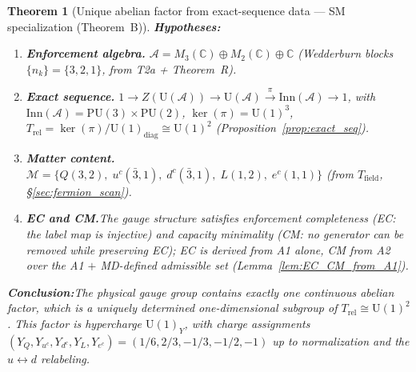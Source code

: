 \documentclass[11pt,a4paper]{article}
\newtheorem{theorem}{Theorem}[section]
\theoremstyle{definition}
\newcommand{\U}{\mathrm{U}}
\begin{document}
\begin{theorem}[Unique abelian factor from exact-sequence data ---
SM specialization (Theorem~B)]%
\label{thm:unique_U1_consolidated}
\textbf{Hypotheses:}
\begin{enumerate}[label=(H\arabic*),nosep]
  \item \textbf{Enforcement algebra.}\quad
  $\mathcal{A} = M_3(\mathbb{C}) \oplus M_2(\mathbb{C}) \oplus
  \mathbb{C}$ (Wedderburn blocks $\{n_k\} = \{3, 2, 1\}$, from
  T2a + Theorem~R).
  \item \textbf{Exact sequence.}\quad
  $1 \to Z(\mathrm{U}(\mathcal{A})) \to \mathrm{U}(\mathcal{A})
  \xrightarrow{\pi} \mathrm{Inn}(\mathcal{A}) \to 1$, with
  $\mathrm{Inn}(\mathcal{A}) = \mathrm{PU}(3) \times \mathrm{PU}(2)$,
  $\ker(\pi) = \mathrm{U}(1)^3$,
  $T_{\mathrm{rel}} = \ker(\pi) / \mathrm{U}(1)_{\mathrm{diag}}
  \cong \mathrm{U}(1)^2$
  (Proposition~\ref{prop:exact_seq}).
  \item \textbf{Matter content.}\quad
  $\mathcal{M} = \{Q(3,2),\; u^c(\bar{3},1),\; d^c(\bar{3},1),\;
  L(1,2),\; e^c(1,1)\}$ (from $T_{\mathrm{field}}$,
  \S\ref{sec:fermion_scan}).
  \item \textbf{EC and CM.}\quad The gauge structure satisfies
  enforcement completeness (EC: the label map is injective) and
  capacity minimality (CM: no generator can be removed while
  preserving EC); EC is derived from A1 alone, CM from A2 over the
  A1 $+$ MD-defined admissible set
  (Lemma~\ref{lem:EC_CM_from_A1}).
\end{enumerate}

\smallskip\noindent\textbf{Conclusion:}\quad The physical gauge group
contains exactly one continuous abelian factor, which is a uniquely
determined one-dimensional subgroup of $T_{\mathrm{rel}} \cong
\mathrm{U}(1)^2$.  This factor is hypercharge $\U(1)_Y$, with charge
assignments $(Y_Q, Y_{u^c}, Y_{d^c}, Y_L, Y_{e^c}) =
(1/6, 2/3, -1/3, -1/2, -1)$ up to normalization and the
$u \leftrightarrow d$ relabeling.
\end{theorem}
\end{document}
